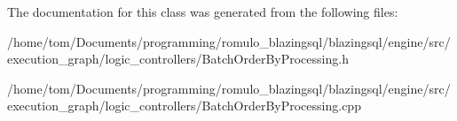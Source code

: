 The documentation for this class was generated from the following files\+:\begin{DoxyCompactItemize}
\item 
/home/tom/\+Documents/programming/romulo\+\_\+blazingsql/blazingsql/engine/src/execution\+\_\+graph/logic\+\_\+controllers/Batch\+Order\+By\+Processing.\+h\item 
/home/tom/\+Documents/programming/romulo\+\_\+blazingsql/blazingsql/engine/src/execution\+\_\+graph/logic\+\_\+controllers/Batch\+Order\+By\+Processing.\+cpp\end{DoxyCompactItemize}

